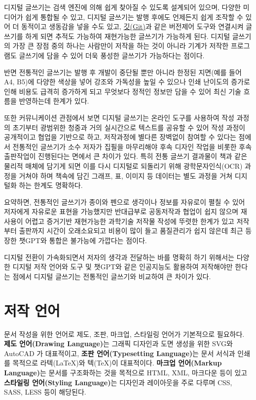 \documentclass[
  letterpaper,
]{book}
\begin{document}
디지털 글쓰기는 검색 엔진에 의해 쉽게 찾아질 수 있도록 설계되어 있으며,
다양한 미디어가 쉽게 통합될 수 있고, 디지털 글쓰기는 발행 후에도
언제든지 쉽게 조작할 수 있어 더 동적이고 생동감을 넣을 수도 있고,
\href{https://git-scm.com/}{깃(Git)}과 같은 버전제어 도구와 연결시켜
글쓰기를 하게 되면 추적도 가능하여 재현가능한 글쓰기가 가능하게 된다.
디지털 글쓰기의 가장 큰 장점 중의 하나는 사람만이 저작을 하는 것이
아니라 기계가 저작한 프로그램도 글쓰기에 담을 수 있어 더욱 풍성한
글쓰기가 가능하다는 점이다.

반면 전통적인 글쓰기는 발행 후 개발이 중단될 뿐만 아니라 한정된
지면(예를 들어 A4, B5)에 다양한 색상을 넣어 강조와 가독성을 높일 수
있으나 인쇄 난이도의 증가로 인해 비용도 급격히 증가하게 되고 무엇보다
정적인 정보만 담을 수 있어 최신 기술 흐름을 반영하는데 한계가 있다.

또한 커뮤니케이션 관점에서 보면 디지털 글쓰기는 온라인 도구를 사용하여
작성 과정의 초기부터 광범위한 청중과 거의 실시간으로 텍스트를 공유할 수
있어 작성 과정이 공개적이고 협업을 기반으로 하고, 저작과정에 별다른
장벽없이 참여할 수 있다는 점에서 전통적인 글쓰기가 소수 저자가 집필을
마무리해야 후속 디자인 작업을 비롯한 후속 출판작업이 진행된다는 면에서
큰 차이가 있다. 특히 전통 글쓰기 결과물이 책과 같은 물리적 매체에 담기게
되면 이를 다시 디지털로 되돌리기 위해 광학문자인식(OCR) 과정을 거쳐야
하며 책속에 담긴 그래프, 표, 이미지 등 데이터는 별도 과정을 거쳐
디지털화 하는 한계도 명확하다.

요약하면, 전통적인 글쓰기가 종이와 펜으로 생각이나 정보를 자유로이 펼칠
수 있어 저자에게 자유로운 표현을 가능했지만 반대급부로 공동저작과 협업이
쉽지 않으며 재사용이 어렵고 증거기반 재현가능한 과학기술 저작물 작성에
뚜렷한 한계가 있고 저작부터 출판까지 시간이 오래소요되고 비용이 많이
들고 품질관리가 쉽지 않은데 최근 등장한 챗GPT와 통합은 불가능에 가깝다는
점이다.

디지털 전환이 가속화되면서 저자의 생각과 전달하는 바를 명확히 하기
위해서는 다양한 디지털 저작 언어와 도구 및 챗GPT와 같은 인공지능도
활용하여 저작해야만 한다는 점에서 디지털 글쓰기는 전통적인 글쓰기와
비교하여 큰 차이가 있다.

\hypertarget{uxc800uxc791-uxc5b8uxc5b4}{%
\section{저작 언어}\label{uxc800uxc791-uxc5b8uxc5b4}}

문서 작성을 위한 언어로 제도, 조판, 마크업, 스타일링 언어가 기본적으로
필요하다. \textbf{제도 언어(Drawing Language)}는 그래픽 디자인과 도면
생성을 위한 SVG와 AutoCAD 가 대표적이고, \textbf{조판 언어(Typesetting
Language)}는 문서 서식과 인쇄를 목적으로 라텍(LaTeX)와 텍(TeX)이
대표적이다. \textbf{마크업 언어(Markup Language)}는 문서를 구조화하는
것을 목적으로 HTML, XML, 마크다운 등이 있고 \textbf{스타일링
언어(Styling Language)}는 디자인과 레이아웃을 주로 다루며 CSS, SASS,
LESS 등이 해당된다.
\end{document}
